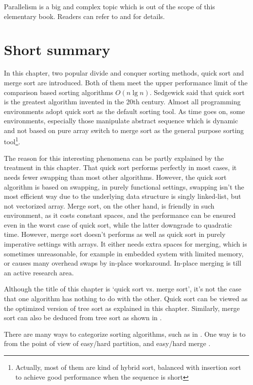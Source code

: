 \documentclass[UTF8]{article}
\begin{document}
Parallelism is a big and complex
topic which is out of the scope of this elementary book. Readers can refer to
\cite{para-msort} and \cite{para-qsort} for details.

\section{Short summary}
In this chapter, two popular divide and conquer sorting methods, quick sort and merge sort are introduced.
Both of them meet the upper performance limit of the comparison based sorting algorithms $O(n \lg n)$.
Sedgewick said that quick sort is the greatest algorithm invented in the 20th century. Almost
all programming environments adopt quick sort as the default sorting tool. As time goes on,
some environments, especially those manipulate abstract sequence which is dynamic and not based on
pure array switch to merge sort as the general purpose sorting tool\footnote{Actually, most of
them are kind of hybrid sort, balanced with insertion sort to achieve good performance when the
sequence is short}.

The reason for this interesting phenomena can be partly explained by the treatment in this chapter.
That quick sort performs perfectly in most cases, it needs fewer swapping than most other algorithms.
However, the quick sort algorithm is based on swapping, in purely functional settings, swapping isn't
the most efficient way due to the underlying data structure is singly linked-list, but not vectorized
array. Merge sort, on the other hand, is friendly in such environment, as it costs constant spaces,
and the performance can be ensured even in the worst case of quick sort, while the latter downgrade
to quadratic time. However, merge sort doesn't performs as well as quick sort in purely imperative
settings with arrays. It either needs extra spaces for merging, which is sometimes unreasonable, for
example in embedded system with limited memory, or causes many overhead swaps by in-place workaround.
In-place merging is till an active research area.

Although the title of this chapter is `quick sort vs. merge sort', it's not the case that one
algorithm has nothing to do with the other. Quick sort can be viewed as the optimized version of
tree sort as explained in this chapter. Similarly, merge sort can also be deduced from tree sort
as shown in \cite{sort-deriving}.

There are many ways to categorize sorting algorithms, such as in \cite{TAOCP}. One way is to
from the point of view of easy/hard partition, and easy/hard merge \cite{algo-fp}.
\end{document}
